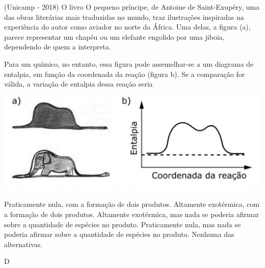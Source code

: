 \documentclass[9qpt]{scrartcl}
\begin{document}
\begin{exercise}
(Unicamp - 2018) O livro O pequeno príncipe, de Antoine de Saint-Exupéry, uma das obras literárias mais traduzidas no mundo, traz ilustrações inspiradas na experiência do autor como aviador no norte da África. Uma delas, a figura (a), parece representar um chapéu ou um elefante engolido por uma jiboia, dependendo de quem a interpreta.

Para um químico, no entanto, essa figura pode assemelhar-se a um diagrama de entalpia, em função da coordenada da reação (figura b). Se a comparação for válida, a variação de entalpia dessa reação seria

\begin{center}
\includegraphics[width=.9\linewidth]{Fisico_Quimica/Termoquimica/figurab.jpg}
\end{center}


\begin{choice}
\choice Praticamente nula, com a formação de dois produtos.
\choice Altamente exotérmica, com a formação de dois produtos.
\choice Altamente exotérmica, mas nada se poderia afirmar sobre a quantidade de espécies no produto.
\choice Praticamente nula, mas nada se poderia afirmar sobre a quantidade de espécies no produto. 
\choice Nenhuma das alternativas.
\end{choice}
\end{exercise}
\begin{solution}
D
\end{solution}









\end{document}

